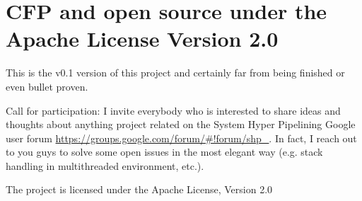 \chapter{CFP and open source under the Apache License Version 2.0}

This is the v0.1 version of this project and certainly far from being finished or even bullet proven. 

Call for participation: I invite everybody who is interested to share ideas and thoughts about anything project related on the System Hyper Pipelining Google user forum \url{https://groups.google.com/forum/#!forum/shp_}. In fact, I reach out to you guys to solve some open issues in the most elegant way (e.g. stack handling in multithreaded environment, etc.).

The project is licensed under the Apache License, Version 2.0
